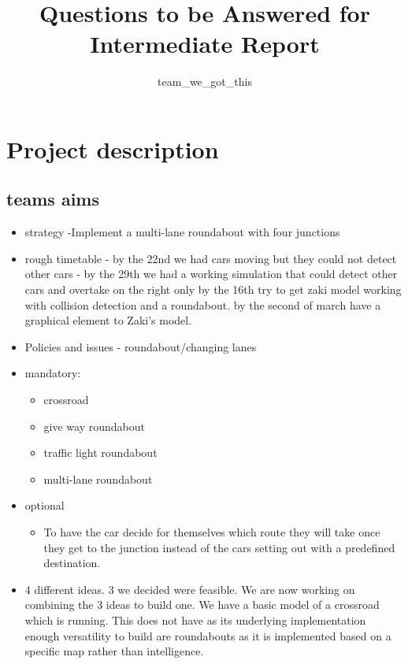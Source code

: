 \documentclass[]{article}
\title{Questions to be Answered for Intermediate Report}
\author{team\_we\_got\_this}
\begin{document}
\maketitle


\section*{Project description}

\subsection*{teams aims}
\begin{itemize}
	\item strategy -Implement a multi-lane roundabout with four junctions 
	\item rough timetable - by the 22nd we had cars moving but they could not detect other cars
	- by the 29th we had a working simulation that could detect other cars and overtake on the right only
	by the 16th try to get zaki model working with collision detection and a roundabout.
	by the second of march have a graphical element to Zaki's model. 
	\item Policies and issues - roundabout/changing lanes
	\item mandatory:
	\begin{itemize}
		\item crossroad
		\item give way roundabout
		\item traffic light roundabout
		\item multi-lane roundabout
	\end{itemize}
	\item optional
	\begin{itemize}
		\item To have the car decide for themselves which route they will take once they get to the junction instead of the cars setting out with a predefined destination. 
\end{itemize} 	
		
	\item 4 different ideas. 3 we decided were feasible. We are now working on combining the 3 ideas to build one. We have a basic model of a crossroad which is running. This does not have as its underlying implementation enough versatility to build are roundabouts as it is implemented based on a specific map rather than intelligence. 
	
	\
\end{itemize}
 
\end{document}
